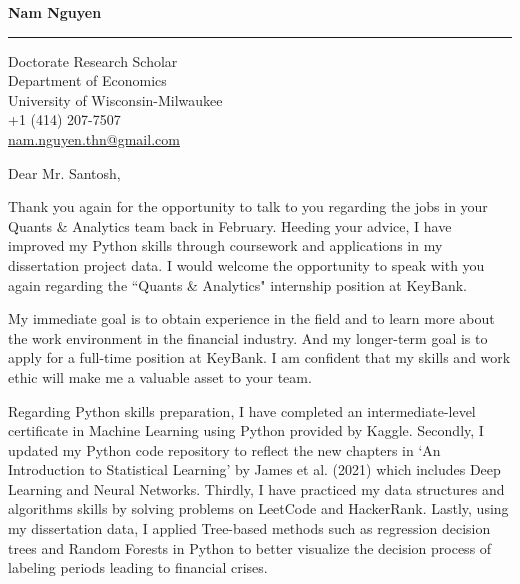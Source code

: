 \documentclass[12pt]{letter} %
\begin{document}
\signature{\vspace{-25pt}Nam Nguyen}           %
\longindentation=0pt                      %
\vspace{-10pt}\let\raggedleft\raggedright              %


\begin{letter}%

	
\date{\today}


\begin{flushleft}
\textbf{Nam Nguyen}
\end{flushleft}
\hrule height 1pt
\begin{flushright}
\hfill Doctorate Research Scholar \\ \hfill Department of Economics \\ \hfill University of Wisconsin-Milwaukee \\ \hfill +1 (414) 207-7507 \\ \hfill \href{mailto:nam.nguyen.thn@gmail.com}{nam.nguyen.thn@gmail.com} %
\end{flushright} 
 
 
\vspace*{-10pt}

\opening{}

\vspace{-10pt} Dear Mr. Santosh,

Thank you again for the opportunity to talk to you regarding the jobs in your Quants \& Analytics team back in February. Heeding your advice, I have improved my Python skills through coursework and applications in my dissertation project data. I would welcome the opportunity to speak with you again regarding the “Quants \& Analytics" internship position at KeyBank. 

My immediate goal is to obtain experience in the field and to learn more about the work environment in the financial industry. And my longer-term goal is to apply for a full-time position at KeyBank. I am confident that my skills and work ethic will make me a valuable asset to your team.

Regarding Python skills preparation, I have completed an intermediate-level certificate in Machine Learning using Python provided by Kaggle. Secondly, I updated my Python code repository to reflect the new chapters in `An Introduction to Statistical Learning' by James et al. (2021) which includes Deep Learning and Neural Networks. Thirdly, I have practiced my data structures and algorithms skills by solving problems on LeetCode and HackerRank. Lastly, using my dissertation data, I applied Tree-based methods such as regression decision trees and Random Forests in Python  to better visualize the decision process of labeling periods leading to financial crises.


\end{letter}
\end{document}
